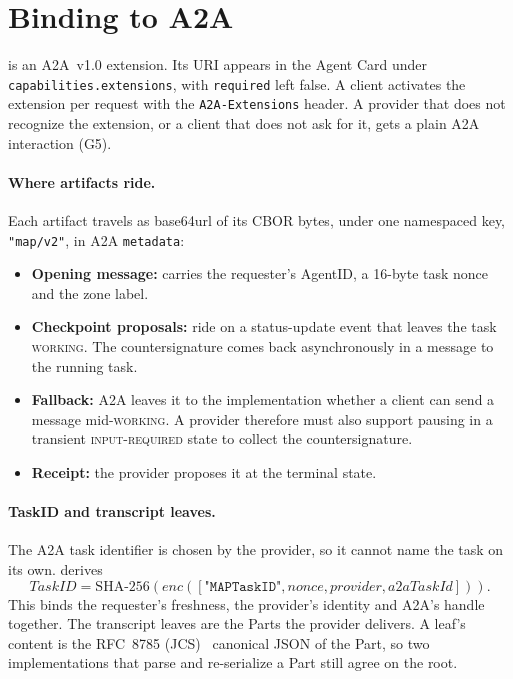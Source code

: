 \section{Binding to A2A}
\label{sec:binding}

\sys{} is an A2A~v1.0 extension. Its URI appears in the Agent Card under
\texttt{capabilities.extensions}, with \texttt{required} left false. A
client activates the extension per request with the
\texttt{A2A-Extensions} header. A provider that does not recognize the
extension, or a client that does not ask for it, gets a plain A2A
interaction (G5).

\paragraph{Where artifacts ride.}
Each \sys{} artifact travels as base64url of its CBOR bytes, under one
namespaced key, \texttt{"map/v2"}, in A2A \texttt{metadata}:
\begin{itemize}
\item \textbf{Opening message:} carries the requester's AgentID, a
  16-byte task nonce and the zone label.
\item \textbf{Checkpoint proposals:} ride on a status-update event that
  leaves the task \textsc{working}. The countersignature comes back
  asynchronously in a message to the running task.
\item \textbf{Fallback:} A2A leaves it to the implementation whether a
  client can send a message mid-\textsc{working}. A provider therefore
  must also support pausing in a transient \textsc{input-required} state
  to collect the countersignature.
\item \textbf{Receipt:} the provider proposes it at the terminal state.
\end{itemize}

\paragraph{TaskID and transcript leaves.}
The A2A task identifier is chosen by the provider, so it cannot name the
task on its own. \sys{} derives
\[
\mathit{TaskID} = \mathrm{SHA\text{-}256}(\mathit{enc}([
\texttt{"MAPTaskID"}, \mathit{nonce}, \mathit{provider}, \mathit{a2aTaskId}])).
\]
This binds the requester's freshness, the provider's identity and A2A's
handle together. The transcript leaves are the Parts the provider
delivers. A leaf's content is the RFC~8785 (JCS)~\cite{rfc8785} canonical
JSON of the Part, so two implementations that parse and re-serialize a
Part still agree on the root.

